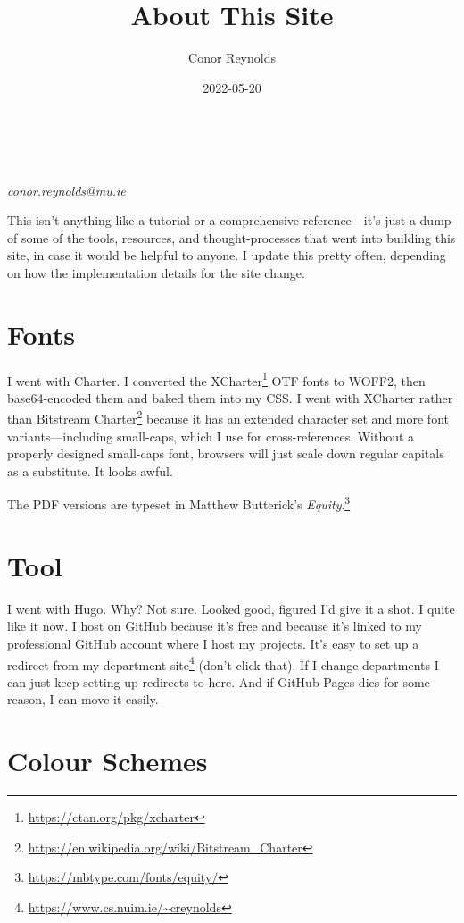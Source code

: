 \documentclass[a4paper,11pt,oneside,article]{memoir}
\title{About This Site}
\author{Conor Reynolds}
\date{2022-05-20}
\begin{document}
\begin{raggedright}
{\equityspaced \huge \thetitle}\\[1em]
\text{\theauthor}\\
\textit{\href{mailto:conor.reynolds@mu.ie}{conor.reynolds@mu.ie}}
\end{raggedright}
\vspace{2em}

This isn't anything like a tutorial or a comprehensive reference—it's just a dump of some of the tools, resources, and thought-processes that went into building this site, in case it would be helpful to anyone. I update this pretty often, depending on how the implementation details for the site change.

\chapter[Fonts]{Fonts}

I went with Charter. I converted the XCharter\footnote{\url{https://ctan.org/pkg/xcharter}} OTF fonts to WOFF2, then base64-encoded them and baked them into my CSS. I went with XCharter rather than Bitstream Charter\footnote{\url{https://en.wikipedia.org/wiki/Bitstream_Charter}} because it has an extended character set and more font variants—including small-caps, which I use for cross-references. Without a properly designed small-caps font, browsers will just scale down regular capitals as a substitute. It looks awful.

The PDF versions are typeset in Matthew Butterick's \emph{Equity}.\footnote{\url{https://mbtype.com/fonts/equity/}}

\chapter[Tool]{Tool}

I went with Hugo. Why? Not sure. Looked good, figured I'd give it a shot. I quite like it now. I host on GitHub because it's free and because it's linked to my professional GitHub account where I host my projects. It's easy to set up a redirect from my department site\footnote{\url{https://www.cs.nuim.ie/~creynolds}} (don't click that). If I change departments I can just keep setting up redirects to here. And if GitHub Pages dies for some reason, I can move it easily.

\chapter[Colour Schemes]{Colour Schemes}
\end{document}
